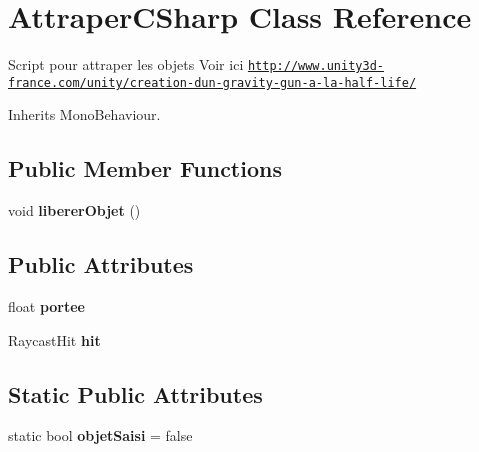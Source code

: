 \hypertarget{class_attraper_c_sharp}{\section{Attraper\+C\+Sharp Class Reference}
\label{class_attraper_c_sharp}
}


Script pour attraper les objets Voir ici \href{http://www.unity3d-france.com/unity/creation-dun-gravity-gun-a-la-half-life/}{\tt http\+://www.\+unity3d-\/france.\+com/unity/creation-\/dun-\/gravity-\/gun-\/a-\/la-\/half-\/life/}  




Inherits Mono\+Behaviour.

\subsection*{Public Member Functions}
\begin{DoxyCompactItemize}
\item 
\hypertarget{class_attraper_c_sharp_a1970cf0bd3a9b4369de9b9f0fc0ba637}{void {\bfseries liberer\+Objet} ()}\label{class_attraper_c_sharp_a1970cf0bd3a9b4369de9b9f0fc0ba637}

\end{DoxyCompactItemize}
\subsection*{Public Attributes}
\begin{DoxyCompactItemize}
\item 
\hypertarget{class_attraper_c_sharp_a419338382fcd5bfdeb8b5f33a0d51cb5}{float {\bfseries portee}}\label{class_attraper_c_sharp_a419338382fcd5bfdeb8b5f33a0d51cb5}

\item 
\hypertarget{class_attraper_c_sharp_a5d16ace2a6d9dbf0e870d020fa6f7389}{Raycast\+Hit {\bfseries hit}}\label{class_attraper_c_sharp_a5d16ace2a6d9dbf0e870d020fa6f7389}

\end{DoxyCompactItemize}
\subsection*{Static Public Attributes}
\begin{DoxyCompactItemize}
\item 
\hypertarget{class_attraper_c_sharp_a02f1cc535752eb66b43c03eb96e050c4}{static bool {\bfseries objet\+Saisi} = false}\label{class_attraper_c_sharp_a02f1cc535752eb66b43c03eb96e050c4}

\end{DoxyCompactItemize}


